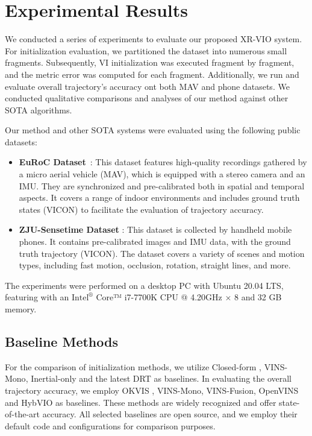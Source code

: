 \section{Experimental Results}
\label{sec:Experimental_Results}
We conducted a series of experiments to evaluate our proposed XR-VIO system. For initialization evaluation, we partitioned the dataset into numerous small fragments. Subsequently, VI initialization was executed fragment by fragment, and the metric error was computed for each fragment. Additionally, we run and evaluate overall trajectory's accuracy ont both MAV and phone datasets. We conducted qualitative comparisons and analyses of our method against other SOTA algorithms.

Our method and other SOTA systems were evaluated using the following public datasets:
\begin{itemize}
    \item \textbf{EuRoC Dataset}~\cite{Burri25012016-EuRoC}: This dataset features high-quality recordings gathered by a micro aerial vehicle (MAV), which is equipped with a stereo camera and an IMU. They are synchronized and pre-calibrated both in spatial and temporal aspects. It covers a range of indoor environments and includes ground truth states (VICON) to facilitate the evaluation of trajectory accuracy.
    \item \textbf{ZJU-Sensetime Dataset} \cite{jinyu2019survey}: This dataset is collected by handheld mobile phones. It contains pre-calibrated images and IMU data, with the ground truth trajectory (VICON). The dataset covers a variety of scenes and motion types, including fast motion, occlusion, rotation, straight lines, and more.
\end{itemize}

The experiments were performed on a desktop PC with Ubuntu 20.04 LTS, featuring with an $\text{Intel}^{\circledR }$ Core™ i7-7700K CPU @ 4.20GHz × 8 and 32 GB memory. 

\subsection{Baseline Methods}
For the comparison of initialization methods, we utilize Closed-form \cite{martinelli2014closed}, VINS-Mono\cite{qin-tro-2018_VINS-Mono}, Inertial-only \cite{campos2020inertial} and the latest DRT\cite{Rotation-Translation-Decoupled} as baselines. 
In evaluating the overall trajectory accuracy, we employ OKVIS \cite{leutenegger-ijrr-2015-OKVIS}, VINS-Mono\cite{qin-tro-2018_VINS-Mono}, VINS-Fusion\cite{qin2019a_VINS_Fusion_Local}, OpenVINS\cite{geneva2020openvins} and HybVIO\cite{hybvio} as baselines. These methods are widely recognized and offer state-of-the-art accuracy. All selected baselines are open source, and we employ their default code and configurations for comparison purposes.

